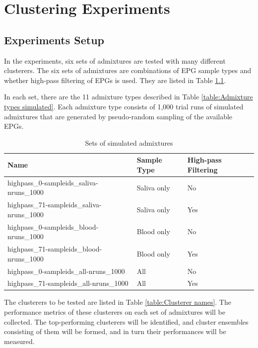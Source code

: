 
\chapter{Clustering Experiments}
\label{ch:Clustering Experiments}
\thispagestyle{myheadings}

\section{Experiments Setup}

In the experiments, six sets of admixtures are tested with many different clusterers. The six sets of admixtures are combinations of EPG sample types and whether high-pass filtering of EPGs is used. They are listed in Table \ref{table:Sets of simulated admixtures}.

In each set, there are the 11 admixture types described in Table \ref{table:Admixture types simulated}. Each admixture type consists of 1,000 trial runs of simulated admixtures that are generated by pseudo-random sampling of the available EPGs.

\begin{table}
\centering
\begin{tabular}{lll}
\toprule
                                   Name & Sample Type & High-pass Filtering \\
\midrule
 highpass\_0-sampleids\_saliva-nruns\_1000 & Saliva only &                  No \\
highpass\_71-sampleids\_saliva-nruns\_1000 & Saliva only &                 Yes \\
  highpass\_0-sampleids\_blood-nruns\_1000 &  Blood only &                  No \\
 highpass\_71-sampleids\_blood-nruns\_1000 &  Blood only &                 Yes \\
    highpass\_0-sampleids\_all-nruns\_1000 &         All &                  No \\
   highpass\_71-sampleids\_all-nruns\_1000 &         All &                 Yes \\
\bottomrule
\end{tabular}
\caption{Sets of simulated admixtures}
\label{table:Sets of simulated admixtures}
\end{table}

The clusterers to be tested are listed in Table \ref{table:Clusterer names}. The performance metrics of these clusterers on each set of admixtures will be collected. The top-performing clusterers will be identified, and cluster ensembles consisting of them will be formed, and in turn their performances will be measured.

